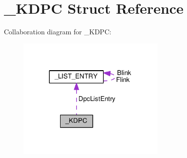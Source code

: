 \hypertarget{struct__KDPC}{}\section{\+\_\+\+K\+D\+P\+C Struct Reference}
\label{struct__KDPC}


Collaboration diagram for \+\_\+\+K\+D\+P\+C\+:
\nopagebreak
\begin{figure}[H]
\begin{center}
\leavevmode
\includegraphics[width=206pt]{struct__KDPC__coll__graph}
\end{center}
\end{figure}
